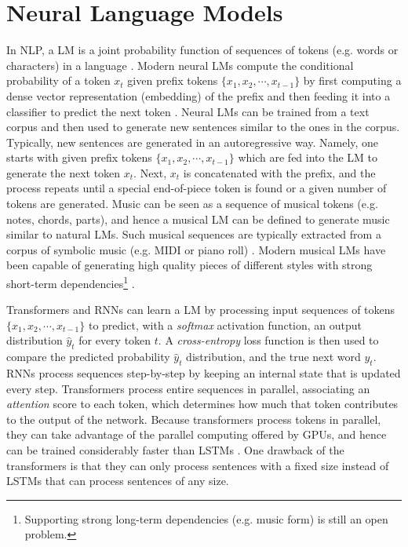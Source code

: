 \section{Neural Language Models}

In NLP, a LM is a joint probability function of sequences of tokens (e.g. words or characters) in a language \cite{bengio2003neural}. Modern neural LMs compute the conditional probability of a token $x_t$ given prefix tokens $\{x_1, x_2, \cdots, x_{t-1}\}$ by first computing a dense vector representation (embedding) of the prefix and then feeding it into a classifier to predict the next token \cite{sun2021revisiting}. Neural LMs can be trained from a text corpus and then used to generate new sentences similar to the ones in the corpus. Typically, new sentences are generated in an autoregressive way. Namely, one starts with given prefix tokens $\{x_1, x_2, \cdots, x_{t-1}\}$ which are fed into the LM to generate the next token $x_t$. Next, $x_t$ is concatenated with the prefix, and the process repeats until a special end-of-piece token is found or a given number of tokens are generated. Music can be seen as a sequence of musical tokens (e.g. notes, chords, parts), and hence a musical LM can be defined to generate music similar to natural LMs. Such musical sequences are typically extracted from a corpus of symbolic music (e.g. MIDI or piano roll) \cite{briot2017deep}. Modern musical LMs have been capable of generating high quality pieces of different styles with strong short-term dependencies\footnote{Supporting strong long-term dependencies (e.g. music form) is still an open problem.} \cite{huang2018music}.

Transformers and RNNs can learn a LM by processing input sequences of tokens $\{x_1, x_2, \cdots, x_{t-1}\}$ to predict, with a \textit{softmax} activation function, an output distribution $\hat{y}_t$ for every token $t$. A \textit{cross-entropy} loss function is then used to compare the predicted probability $\hat{y}_t$ distribution, and the true next word $y_t$. RNNs process sequences step-by-step by keeping an internal state that is updated every step. Transformers process entire sequences in parallel, associating an \textit{attention} score to each token, which determines how much that token contributes to the output of the network. Because transformers process tokens in parallel, they can take advantage of the parallel computing offered by GPUs, and hence can be trained considerably faster than LSTMs \cite{vaswani2017attention}. One drawback of the transformers is that they can only process sentences with a fixed size instead of LSTMs that can process sentences of any size.

